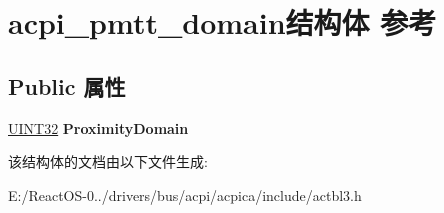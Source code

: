 \hypertarget{structacpi__pmtt__domain}{}\section{acpi\+\_\+pmtt\+\_\+domain结构体 参考}
\label{structacpi__pmtt__domain}
\subsection*{Public 属性}
\begin{DoxyCompactItemize}
\item 
\mbox{\label{structacpi__pmtt__domain_a826c95a1e4a2b19417a66529198dcd1b}} 
\hyperlink{_processor_bind_8h_ae1e6edbbc26d6fbc71a90190d0266018}{U\+I\+N\+T32} {\bfseries Proximity\+Domain}
\end{DoxyCompactItemize}


该结构体的文档由以下文件生成\+:\begin{DoxyCompactItemize}
\item 
E\+:/\+React\+O\+S-\/0../drivers/bus/acpi/acpica/include/actbl3.\+h\end{DoxyCompactItemize}
